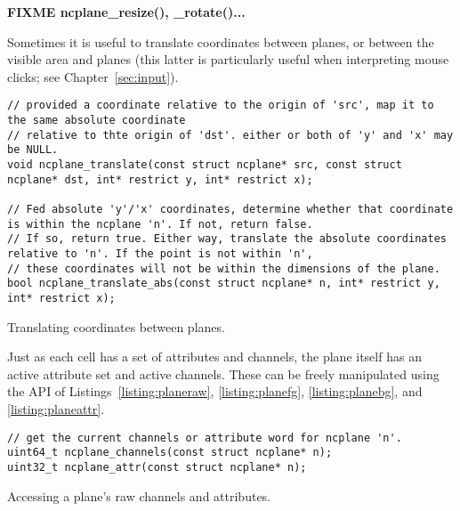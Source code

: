 \textbf{FIXME ncplane\_resize(), \_rotate()...}

Sometimes it is useful to translate coordinates between planes, or between the
visible area and planes (this latter is particularly useful when interpreting
mouse clicks; see Chapter~\ref{sec:input}).
\begin{listing}[!htbp]
\begin{verbatim}
// provided a coordinate relative to the origin of 'src', map it to the same absolute coordinate
// relative to thte origin of 'dst'. either or both of 'y' and 'x' may be NULL.
void ncplane_translate(const struct ncplane* src, const struct ncplane* dst, int* restrict y, int* restrict x);

// Fed absolute 'y'/'x' coordinates, determine whether that coordinate is within the ncplane 'n'. If not, return false.
// If so, return true. Either way, translate the absolute coordinates relative to 'n'. If the point is not within 'n',
// these coordinates will not be within the dimensions of the plane.
bool ncplane_translate_abs(const struct ncplane* n, int* restrict y, int* restrict x);
\end{verbatim}
\caption{Translating coordinates between planes.}
\end{listing}

Just as each cell has a set of attributes and channels, the plane itself has
an active attribute set and active channels. These can be freely manipulated
using the API of Listings~\ref{listing:planeraw}, \ref{listing:planefg}, \ref{listing:planebg}, and
\ref{listing:planeattr}.

\begin{listing}[!htbp]
\begin{verbatim}
// get the current channels or attribute word for ncplane 'n'.
uint64_t ncplane_channels(const struct ncplane* n);
uint32_t ncplane_attr(const struct ncplane* n);
\end{verbatim}
\caption{Accessing a plane's raw channels and attributes.}
\label{listing:planeraw}
\end{listing}

